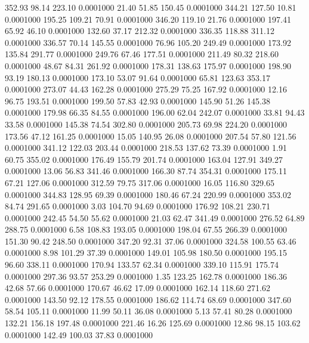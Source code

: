  352.93   98.14  223.10   0.0001000
  21.40   51.85  150.45   0.0001000
 344.21  127.50   10.81   0.0001000
 195.25  109.21   70.91   0.0001000
 346.20  119.10   21.76   0.0001000
 197.41   65.92   46.10   0.0001000
 132.60   37.17  212.32   0.0001000
 336.35  118.88  311.12   0.0001000
 336.57   70.14  145.55   0.0001000
  76.96  105.20  249.49   0.0001000
 173.92  135.84  291.77   0.0001000
 249.76   67.46  177.51   0.0001000
 211.49   80.32  218.60   0.0001000
  48.67   84.31  261.92   0.0001000
 178.31  138.63  175.97   0.0001000
 198.90   93.19  180.13   0.0001000
 173.10   53.07   91.64   0.0001000
  65.81  123.63  353.17   0.0001000
 273.07   44.43  162.28   0.0001000
 275.29   75.25  167.92   0.0001000
  12.16   96.75  193.51   0.0001000
 199.50   57.83   42.93   0.0001000
 145.90   51.26  145.38   0.0001000
 179.98   66.35   84.55   0.0001000
 196.00   62.04  242.07   0.0001000
  33.81   94.43   33.58   0.0001000
 145.38   74.54  302.80   0.0001000
 205.73   69.98  224.20   0.0001000
 173.56   47.12  161.25   0.0001000
  15.05  140.95   26.08   0.0001000
 207.54   57.80  121.56   0.0001000
 341.12  122.03  203.44   0.0001000
 218.53  137.62   73.39   0.0001000
   1.91   60.75  355.02   0.0001000
 176.49  155.79  201.74   0.0001000
 163.04  127.91  349.27   0.0001000
  13.06   56.83  341.46   0.0001000
 166.30   87.74  354.31   0.0001000
 175.11   67.21  127.06   0.0001000
 312.59   79.75  317.06   0.0001000
  16.05  116.80  329.65   0.0001000
 344.83  128.95   69.39   0.0001000
 180.46   67.24  220.99   0.0001000
 353.02   84.74  291.65   0.0001000
   3.03  104.70   94.69   0.0001000
 176.92  108.21  230.71   0.0001000
 242.45   54.50   55.62   0.0001000
  21.03   62.47  341.49   0.0001000
 276.52   64.89  288.75   0.0001000
   6.58  108.83  193.05   0.0001000
 198.04   67.55  266.39   0.0001000
 151.30   90.42  248.50   0.0001000
 347.20   92.31   37.06   0.0001000
 324.58  100.55   63.46   0.0001000
   8.98  101.29   37.39   0.0001000
 149.01  105.98  180.50   0.0001000
 195.15   96.60  338.11   0.0001000
 170.94  133.57   62.34   0.0001000
 339.10  115.91  175.74   0.0001000
 297.36   93.57  253.29   0.0001000
   1.35  123.25  162.78   0.0001000
 186.36   42.68   57.66   0.0001000
 170.67   46.62   17.09   0.0001000
 162.14  118.60  271.62   0.0001000
 143.50   92.12  178.55   0.0001000
 186.62  114.74   68.69   0.0001000
 347.60   58.54  105.11   0.0001000
  11.99   50.11   36.08   0.0001000
   5.13   57.41   80.28   0.0001000
 132.21  156.18  197.48   0.0001000
 221.46   16.26  125.69   0.0001000
  12.86   98.15  103.62   0.0001000
 142.49  100.03   37.83   0.0001000
